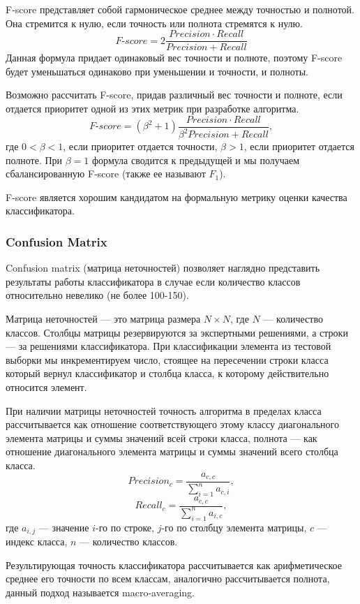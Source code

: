 \documentclass[14pt, a4paper, oneside]{extarticle}
\begin{document}
F-score представляет собой гармоническое среднее между точностью и полнотой. Она стремится к нулю, если точность или полнота стремятся к нулю.
$$F\mbox{-}score = 2 \frac{Precision \cdot Recall}{Precision + Recall}$$
Данная формула придает одинаковый вес точности и полноте, поэтому F-score будет уменьшаться одинаково при уменьшении и точности, и полноты.

Возможно рассчитать F-score, придав различный вес точности и полноте, если отдается приоритет одной из этих метрик при разработке алгоритма.
$$F\mbox{-}score = (\beta^2 + 1) \frac{Precision \cdot Recall}{\beta^2 Precision + Recall},$$
где $0 < \beta < 1$, если приоритет отдается точности, $\beta > 1$, если приоритет отдается полноте. При $\beta = 1$ формула сводится к предыдущей и мы получаем сбалансированную F-score (также ее называют $F_1$).

F-score является хорошим кандидатом на формальную метрику оценки качества классификатора.

\subsubsection{Confusion Matrix}
Confusion matrix (матрица неточностей) позволяет наглядно представить результаты работы классификатора в случае если количество классов относительно невелико (не более 100-150).

Матрица неточностей --- это матрица размера $N \times N$, где $N$ --- количество классов. Столбцы матрицы резервируются за экспертными решениями, а строки --- за решениями классификатора. При классификации элемента из тестовой выборки мы инкрементируем число, стоящее на пересечении строки класса который вернул классификатор и столбца класса, к которому действительно относится элемент.

При наличии матрицы неточностей точность алгоритма в пределах класса рассчитывается как отношение соответствующего этому классу диагонального элемента матрицы и суммы значений всей строки класса, полнота --- как отношение диагонального элемента матрицы и суммы значений всего столбца класса.
$$Precision_c = \frac{a_{c,c}}{\sum_{i=1}^{n} a_{c,i}},$$
$$Recall_c = \frac{a_{c,c}}{\sum_{i=1}^{n} a_{i,c}},$$
где $a_{i,j}$ --- значение $i$-го по строке, $j$-го по столбцу элемента матрицы, $c$ --- индекс класса, $n$ --- количество классов.

Результирующая точность классификатора рассчитывается как арифметическое среднее его точности по всем классам, аналогично рассчитывается полнота, данный подход называется macro-averaging.
\end{document}
